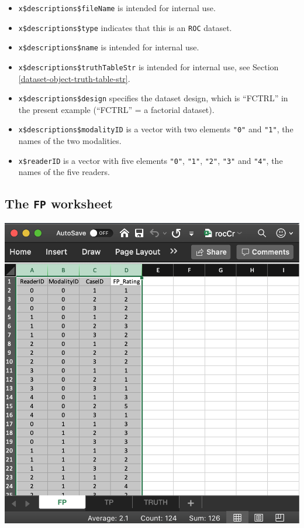 \documentclass[
]{book}
\providecommand{\tightlist}{%
  \setlength{\itemsep}{0pt}\setlength{\parskip}{0pt}}
\begin{document}
\begin{itemize}
\tightlist
\item
  \texttt{x\$descriptions\$fileName} is intended for internal use.
\item
  \texttt{x\$descriptions\$type} indicates that this is an \texttt{ROC} dataset.
\item
  \texttt{x\$descriptions\$name} is intended for internal use.
\item
  \texttt{x\$descriptions\$truthTableStr} is intended for internal use, see Section \ref{dataset-object-truth-table-str}.
\item
  \texttt{x\$descriptions\$design} specifies the dataset design, which is ``FCTRL'' in the present example (``FCTRL'' = a factorial dataset).
\item
  \texttt{x\$descriptions\$modalityID} is a vector with two elements \texttt{"0"} and \texttt{"1"}, the names of the two modalities.
\item
  \texttt{x\$readerID} is a vector with five elements \texttt{"0"}, \texttt{"1"}, \texttt{"2"}, \texttt{"3"} and \texttt{"4"}, the names of the five readers.
\end{itemize}

\hypertarget{dataset-object-details-read-datafile-correspondence-nl-fp}{%
\subsection{\texorpdfstring{The \texttt{FP} worksheet}{The FP worksheet}}\label{dataset-object-details-read-datafile-correspondence-nl-fp}}

\includegraphics[width=1\textwidth,height=\textheight]{images/quick-start/rocCrFp.png}
\end{document}
